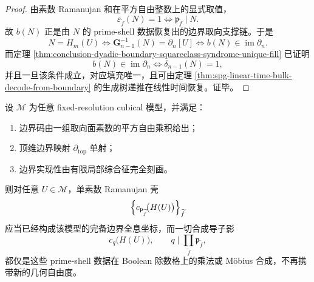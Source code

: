 \begin{proof}
由素数 Ramanujan 和在平方自由整数上的显式取值，
\[
\varepsilon_{\widetilde f}(N)=1
\iff
\mathfrak p_{\widetilde f}\mid N.
\]
故 \(b(N)\) 正是由 \(N\) 的 prime-shell 数据恢复出的边界取向支撑链。于是
\[
N=H_m(U)
\iff
\mathbf G_{n-1}^{-1}(N)=\partial_n[U]
\iff
b(N)\in \operatorname{im}\partial_n.
\]
而定理 \ref{thm:conclusion-dyadic-boundary-squareclass-syndrome-unique-fill} 已证明
\[
b(N)\in \operatorname{im}\partial_n
\iff
\delta_{n-1}(N)=1,
\]
并且一旦该条件成立，对应填充唯一，且可由定理 \ref{thm:spg-linear-time-bulk-decode-from-boundary} 的生成树递推在线性时间恢复。证毕。
\end{proof}

\begin{conjecture}\label{conj:conclusion-squarefree-boundary-model-primeshell-universal-completeness}
设 \(\mathcal M\) 为任意 fixed-resolution cubical 模型，并满足：
\begin{enumerate}
  \item 边界码由一组取向面素数的平方自由乘积给出；
  \item 顶维边界映射 \(\partial_{\mathrm{top}}\) 单射；
  \item 边界实现性由有限局部综合征完全刻画。
\end{enumerate}
则对任意 \(U\in \mathcal M\)，单素数 Ramanujan 壳
\[
\Bigl\{c_{\mathfrak p_{\widetilde f}}\!\bigl(H(U)\bigr)\Bigr\}_{\widetilde f}
\]
应当已经构成该模型的完备边界全息坐标，而一切合成导子影
\[
c_q\!\bigl(H(U)\bigr),
\qquad
q\mid \prod_{\widetilde f}\mathfrak p_{\widetilde f},
\]
都仅是这些 prime-shell 数据在 Boolean 除数格上的乘法或 Möbius 合成，不再携带新的几何自由度。
\end{conjecture}
